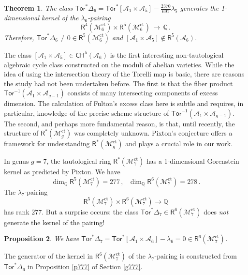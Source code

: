 \documentclass[11pt]{amsart}
\newtheorem{thm}{Theorem}
\newtheorem{prop}[thm]{Proposition}
\theoremstyle{definition}
\newcommand{\qq}{\mathbb{Q}}
\newcommand{\R}{\mathsf{R}}
\newcommand{\M}{\mathcal{M}}
\newcommand{\A}{\mathcal{A}}
\DeclareMathOperator{\ct}{ct}
\newcommand{\Tor}{\mathsf{Tor}}
\begin{document}
    \begin{thm}\label{Delta6}
    The class
    $\Tor^*\Delta_6=\Tor^*[\A_1\times \A_5]-\frac{2370}{691}\lambda_5$
    generates the 1-dimensional kernel of the $\lambda_6$-pairing
    $$\R^4(\M_6^{\ct})\times \R^{5}(\M_6^{\ct})\,\to\,  \mathbb Q\, .$$
    Therefore, $\Tor^*\Delta_6\neq 0\in \mathsf{R}^5(\M_6^{\ct})$ and
    $[\A_1\times \A_5]\notin \mathsf{R}^5(\A_6)$.
\end{thm}



The class $[\mathcal{A}_1 \times \mathcal{A}_5]\in \mathsf{CH}^5(\mathcal{A}_6)$ is the
first interesting non-tautological algebraic cycle class constructed on the moduli of abelian varieties. While the idea of using the
intersection theory of the Torelli map is basic,
there are reasons the study had not been
undertaken before. The first is that 
the fiber product $\Tor^{-1}(\A_1\times \A_{g-1})$
consists of many intersecting components
of excess dimension. 
The calculation of Fulton's excess class here is subtle
and requires, in particular, knowledge 
of the precise scheme structure
of $\Tor^{-1}(\A_1\times \A_{g-1})$.  The second, and perhaps more
fundamental reason, is that, until recently, the
structure of $\mathsf{R}^*(\M_g^{\ct})$
was completely unknown. Pixton's conjecture \cite{Pix} offers a
framework for understanding $\mathsf{R}^*(\M_g^{\ct})$
and plays a crucial role
in our work.



In genus $g=7$, the tautological ring $\mathsf{R}^*(\mathcal{M}_7^{\ct})$
has a 1-dimensional Gorenstein kernel \cite{CLS} as
predicted by Pixton.
We have 
\[
\dim_\qq \R^5(\M_7^{\ct}) = 277\, , \ \ \
\dim_\qq \R^6(\M_7^{\ct}) = 278\, .
\]
 The $\lambda_7$-pairing
\[
\R^5(\M_7^{\ct})\times \R^6(\M_7^{\ct})\rightarrow \qq
\]
has rank $277$.
But a surprise occurs:
the class 
$\Tor^*\Delta_7\in \R^6(\M_7^{\ct})$
does {\em not} generate the kernel of the pairing!

\begin{prop}\label{Delta7}
   We have 
   $\Tor^*\Delta_7=\Tor^*[\A_1\times \A_6]-\lambda_6=0 \in
   \mathsf{R}^6(\M_7^{\ct})$.
\end{prop}

\noindent The generator of the kernel in
$\mathsf{R}^6(\M_7^{\ct})$ of the $\lambda_7$-pairing
is constructed from
$\Tor^*\Delta_6$ in Proposition \ref{p777} of Section \ref{g777}.
\end{document}
